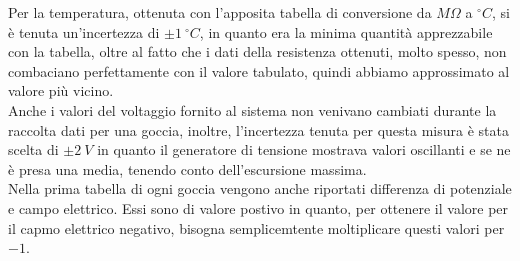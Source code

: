 \documentclass{article}
\begin{document}
Per la temperatura, ottenuta con l'apposita tabella di conversione da $M\Omega$ a $^\circ C$, si è tenuta un'incertezza di $\pm1\ ^\circ C$, in quanto era la minima quantità apprezzabile con la tabella, oltre al fatto che i dati della resistenza ottenuti, molto spesso, non combaciano perfettamente con il valore tabulato, quindi abbiamo approssimato al valore più vicino.\\

Anche i valori del voltaggio fornito al sistema non venivano cambiati durante la raccolta dati per una goccia, inoltre, l'incertezza tenuta per questa misura è stata scelta di $\pm2\ V$ in quanto il generatore di tensione mostrava valori oscillanti e se ne è presa una media, tenendo conto dell'escursione massima.\\

Nella prima tabella di ogni goccia vengono anche riportati differenza di potenziale e campo elettrico. Essi sono di valore postivo in quanto, per ottenere il valore per il capmo elettrico negativo, bisogna semplicemtente moltiplicare questi valori per $-1$.\\

\pagebreak
\end{document}
